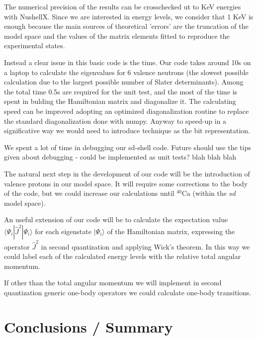 \documentclass[twoside]{article}
\newcommand{\bra}[1]{\langle #1 |}
\newcommand{\ket}[1]{| #1 \rangle}
\begin{document}
The numerical precision of the results can be crosschecked ut to KeV energies with NushellX. Since we are interested in energy levels, we consider that 1 KeV is enough because the main sources of theoretical 'errors' are the truncation of the model space and the values of the matrix elements fitted to reproduce the experimental states.

Instead a clear issue in this basic code is the time. Our code takes around 10s on a laptop to calculate the eigenvalues for 6 valence neutrons (the slowest possible calculation due to the largest possible number of Slater determinants). Among the total time 0.5s are required for the unit test, and the most of the time is spent in bulding the Hamiltonian matrix and diagonalize it. 
The calculating speed can be improved adopting an optimized diagonalization routine to replace the standard diagonalization done with numpy. Anyway to speed-up in a significative way we would need to introduce technique as the bit representation.

We spent a lot of time in debugging our sd-shell code. Future should use the tips given about debugging - could be implemented as unit tests? blah blah blah %


The natural next step in the development of our code will be the introduction of valence protons in our model space. It will require some corrections to the body of the code, but we could increase our calculations until $^{40}$Ca (within the $sd$ model space).

An useful extension of our code will be to calculate the expectation value $\bra{\Psi_i} \hat J^2 \ket{\Psi_i}$ for each eigenstate $\ket{\Psi_i}$ of the Hamiltonian matrix, expressing the operator $\hat J^2$ in second quantization and applying Wick's theorem. In this way we could label each of the calculated energy levels with the relative total angular momentum.

If other than the total angular momentum we will implement in second quantization generic one-body operators we could calculate one-body transitions.

\section{Conclusions / Summary}
\label{sec:summary}
\end{document}
